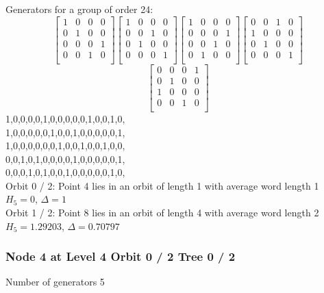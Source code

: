 {\small\arraycolsep=2pt
Generators for a group of order 24:
$$
\left[
\begin{array}{*{4}{r}}
1 & 0 & 0 & 0\\
0 & 1 & 0 & 0\\
0 & 0 & 0 & 1\\
0 & 0 & 1 & 0\\
\end{array}
\right]
\left[
\begin{array}{*{4}{r}}
1 & 0 & 0 & 0\\
0 & 0 & 1 & 0\\
0 & 1 & 0 & 0\\
0 & 0 & 0 & 1\\
\end{array}
\right]
\left[
\begin{array}{*{4}{r}}
1 & 0 & 0 & 0\\
0 & 0 & 0 & 1\\
0 & 0 & 1 & 0\\
0 & 1 & 0 & 0\\
\end{array}
\right]
\left[
\begin{array}{*{4}{r}}
0 & 0 & 1 & 0\\
1 & 0 & 0 & 0\\
0 & 1 & 0 & 0\\
0 & 0 & 0 & 1\\
\end{array}
\right]
$$
$$
\left[
\begin{array}{*{4}{r}}
0 & 0 & 0 & 1\\
0 & 1 & 0 & 0\\
1 & 0 & 0 & 0\\
0 & 0 & 1 & 0\\
\end{array}
\right]
$$
1,0,0,0,0,1,0,0,0,0,0,1,0,0,1,0,\\
1,0,0,0,0,0,1,0,0,1,0,0,0,0,0,1,\\
1,0,0,0,0,0,0,1,0,0,1,0,0,1,0,0,\\
0,0,1,0,1,0,0,0,0,1,0,0,0,0,0,1,\\
0,0,0,1,0,1,0,0,1,0,0,0,0,0,1,0,\\
}
\noindent Orbit 0 / 2: Point 4 lies in an orbit of length 1 with average word length 1 $H_{5} = 0$, $\Delta = 1$\\
\noindent Orbit 1 / 2: Point 8 lies in an orbit of length 4 with average word length 2 $H_{5} = 1.29203$, $\Delta = 0.70797$\\
\subsubsection*{Node 4 at Level 4 Orbit 0 / 2 Tree 0 / 2}
Number of generators 5\\

